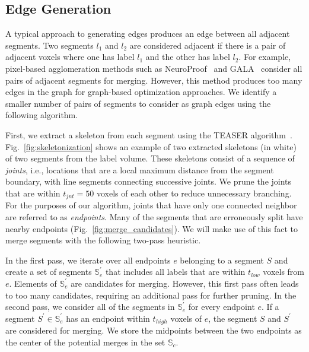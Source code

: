 \subsection{Edge Generation}

A typical approach to generating edges produces an edge between all adjacent segments. Two segments $l_1$ and $l_2$ are considered adjacent if there is a pair of adjacent voxels where one has label $l_1$ and the other has label $l_2$.
For example, pixel-based agglomeration methods such as NeuroProof~\cite{10.1371/journal.pone.0125825} and GALA~\cite{nunez2014graph} consider all pairs of adjacent segments for merging.
However, this method produces too many edges in the graph for graph-based optimization approaches. We identify a smaller number of pairs of segments to consider as graph edges using the following algorithm.

First, we extract a skeleton from each segment using the TEASER algorithm~\cite{sato2000teasar,zhao2014automatic}. Fig.~\ref{fig:skeletonization} shows an example of two extracted skeletons (in white) of two segments from the label volume. These skeletons consist of a sequence of \textit{joints}, i.e., locations that are a local maximum distance from the segment boundary, with line segments connecting successive joints. We prune the joints that are within $t_{jnt} = 50$ voxels of each other to reduce unnecessary branching. For the purposes of our algorithm, joints that have only one connected neighbor are referred to as \textit{endpoints}. Many of the segments that are erroneously split have nearby endpoints  (Fig.~\ref{fig:merge_candidates}). We will make use of this fact to merge segments with the following two-pass heuristic.

In the first pass, we iterate over all endpoints $e$ belonging to a segment $S$ and create a set of segments $\mathbb{S}_e^\prime$ that includes all labels that are within $t_{low}$ voxels from $e$. Elements of $\mathbb{S}_e^\prime$ are candidates for merging. However, this first pass often leads to too many candidates, requiring an additional pass for further pruning. In the second pass, we consider all of the segments in $\mathbb{S}_e^\prime$ for every endpoint $e$. If a segment $S^\prime \in \mathbb{S}_e^\prime$ has an endpoint within $t_{high}$ voxels of $e$, the segment $S$ and $S^\prime$ are considered for merging. We store the midpoints between the two endpoints as the center of the potential merges in the set $\mathbb{S}_c$.

